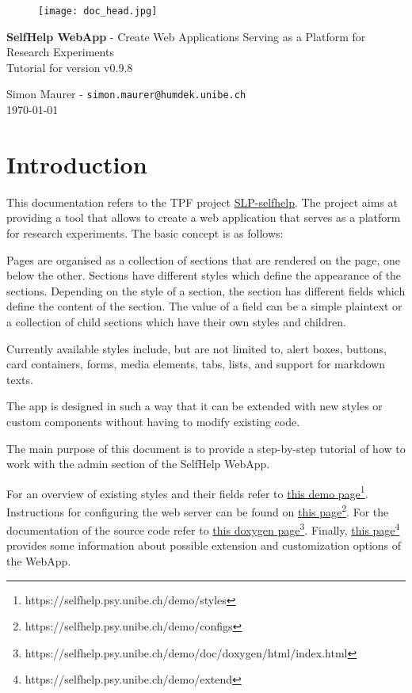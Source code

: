 \documentclass[a4paper,oneside]{book}
\begin{document}
\begin{figure}[h]
  \texttt{[image: doc\_head.jpg]}
\end{figure}

\parindent=0pt
\parskip=0.25cm

\begin{center}
\fontsize{20}{21}\selectfont

\textbf{SelfHelp WebApp} - Create Web Applications Serving as a Platform for Research Experiments\\
\vskip 6mm
Tutorial for version v0.9.8
\vskip 6mm

\fontsize{13}{14}\selectfont
Simon Maurer - \texttt{simon.maurer@humdek.unibe.ch}\\
\today
\end{center}

\tableofcontents

\chapter{Introduction}\label{sec.intro}

This documentation refers to the TPF project \href{http://phhum-g111-nns.unibe.ch:10012/SLP/SLP-sleep_coach}{SLP-selfhelp}.
The project aims at providing a tool that allows to create a web application that serves as a platform for research experiments.
The basic concept is as follows:

Pages are organised as a collection of sections that are rendered on the page, one below the other.
Sections have different styles which define the appearance of the sections.
Depending on the style of a section, the section has different fields which define the content of the section.
The value of a field can be a simple plaintext or a collection of child sections which have their own styles and children.

Currently available styles include, but are not limited to, alert boxes, buttons, card containers, forms, media elements, tabs, lists, and support for markdown texts.

The app is designed in such a way that it can be extended with new styles or custom components without having to modify existing code.

The main purpose of this document is to provide a step-by-step tutorial of how to work with the admin section of the SelfHelp WebApp.

For an overview of existing styles and their fields refer to \href{https://selfhelp.psy.unibe.ch/demo/styles}{this demo page}\footnote{https://selfhelp.psy.unibe.ch/demo/styles}.
Instructions for configuring the web server can be found on \href{https://selfhelp.psy.unibe.ch/demo/configs}{this page}\footnote{https://selfhelp.psy.unibe.ch/demo/configs}.
For the documentation of the source code refer to \href{https://selfhelp.psy.unibe.ch/demo/doc/doxygen/html/index.html}{this doxygen page}\footnote{https://selfhelp.psy.unibe.ch/demo/doc/doxygen/html/index.html}.
Finally, \href{https://selfhelp.psy.unibe.ch/demo/extend}{this page}\footnote{https://selfhelp.psy.unibe.ch/demo/extend} provides some information about possible extension and customization options of the WebApp.
\end{document}
